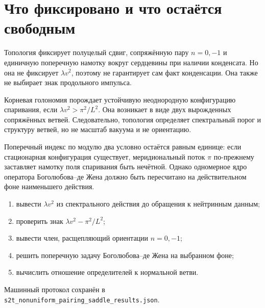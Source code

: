 \section{Что фиксировано и что остаётся свободным}

Топология фиксирует полуцелый сдвиг, сопряжённую пару \(n=0,-1\) и
единичную поперечную намотку вокруг сердцевины при наличии конденсата.
Но она не фиксирует \(\lambda v^2\), поэтому не гарантирует сам факт
конденсации. Она также не выбирает знак продольного импульса.

\begin{proposition}
Корневая голономия порождает устойчивую неоднородную конфигурацию
спаривания, если \(\lambda v^2>\pi^2/L^2\). Она возникает в виде двух
вырожденных сопряжённых ветвей. Следовательно, топология определяет
спектральный порог и структуру ветвей, но не масштаб вакуума и не
ориентацию.
\end{proposition}

Поперечный индекс по модулю два условно остаётся равным единице: если
стационарная конфигурация существует, меридиональный поток \(\pi\)
по-прежнему заставляет намотку поля спаривания быть нечётной. Однако
одномерное ядро оператора Боголюбова--де Жена должно быть пересчитано на
действительном фоне наименьшего действия.

\begin{protocol}
\begin{enumerate}
 \item вывести \(\lambda v^2\) из спектрального действия до обращения к
 нейтринным данным;
 \item проверить знак \(\lambda v^2-\pi^2/L^2\);
 \item вывести член, расщепляющий ориентации \(n=0,-1\);
 \item решить поперечную задачу Боголюбова--де Жена на выбранном фоне;
 \item вычислить отношение определителей к нормальной ветви.
\end{enumerate}
\end{protocol}

Машинный протокол сохранён в
\texttt{s2t\_nonuniform\_pairing\_saddle\_results.json}.